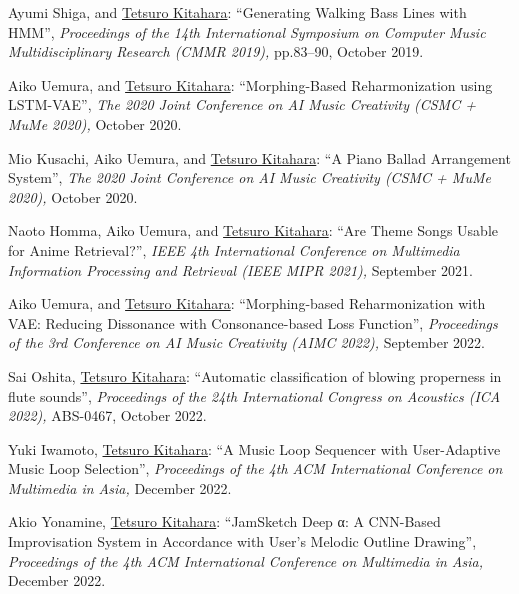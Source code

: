 \begin{Enumerate}
\item 
Ayumi Shiga, 
and 
\underline{Tetsuro Kitahara}: 
    ``Generating Walking Bass Lines with HMM'', 
    {\it Proceedings of the 14th International Symposium on Computer Music Multidisciplinary Research (CMMR 2019),
    } pp.83--90, October 2019. 

\item 
Aiko Uemura, 
and 
\underline{Tetsuro Kitahara}: 
    ``Morphing-Based Reharmonization using LSTM-VAE'', 
    {\it The 2020 Joint Conference on AI Music Creativity (CSMC + MuMe 2020),
    } October 2020. 

\item 
Mio Kusachi, 
Aiko Uemura, 
and 
\underline{Tetsuro Kitahara}: 
    ``A Piano Ballad Arrangement System'', 
    {\it The 2020 Joint Conference on AI Music Creativity (CSMC + MuMe 2020),
    } October 2020. 

\item 
Naoto Homma, 
Aiko Uemura, 
and 
\underline{Tetsuro Kitahara}: 
    ``Are Theme Songs Usable for Anime Retrieval?'', 
    {\it IEEE 4th International Conference on Multimedia Information Processing and Retrieval (IEEE MIPR 2021),
    } September 2021. 

\item 
Aiko Uemura, 
and 
\underline{Tetsuro Kitahara}: 
    ``Morphing-based Reharmonization with VAE: Reducing Dissonance with Consonance-based Loss Function'', 
    {\it Proceedings of the 3rd Conference on AI Music Creativity (AIMC 2022),
    } September 2022. 

\item 
Sai Oshita, 
\underline{Tetsuro Kitahara}: 
    ``Automatic classification of blowing properness in flute sounds'', 
    {\it Proceedings of the 24th International Congress on Acoustics (ICA 2022),
    } ABS-0467, October 2022. 

\item 
Yuki Iwamoto, 
\underline{Tetsuro Kitahara}: 
    ``A Music Loop Sequencer with User-Adaptive Music Loop Selection'', 
    {\it Proceedings of the 4th ACM International Conference on Multimedia in Asia,
    } December 2022. 

\item 
Akio Yonamine, 
\underline{Tetsuro Kitahara}: 
    ``JamSketch Deep α: A CNN-Based Improvisation System in Accordance with User's Melodic Outline Drawing'', 
    {\it Proceedings of the 4th ACM International Conference on Multimedia in Asia,
    } December 2022. 

\end{Enumerate}

